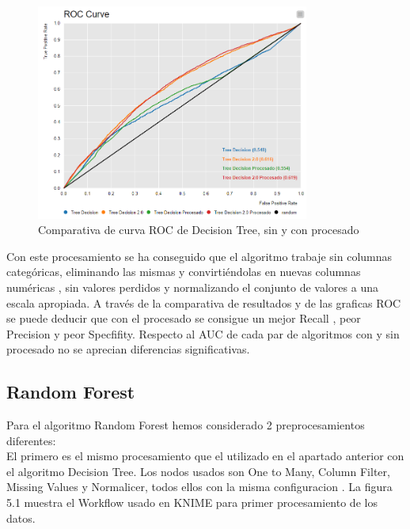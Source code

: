 	\begin{figure}[htb]
		\centering
		\includegraphics[width=0.8\textwidth]{./imagenes/60}
		\caption{Comparativa de curva ROC de Decision Tree, sin y con procesado} \label{fig:1}
	\end{figure}
	
	Con este procesamiento se ha conseguido que el algoritmo trabaje sin columnas categóricas, eliminando las mismas y convirtiéndolas en nuevas columnas numéricas , sin valores perdidos y normalizando el conjunto de valores a una escala apropiada. A través de la comparativa de resultados y de las graficas ROC se puede deducir que con el procesado se consigue un mejor Recall , peor Precision y peor Specfifity. Respecto al AUC de cada par de algoritmos con y sin procesado no se aprecian diferencias significativas.
	
	
	\subsection{Random Forest}
	
	Para el algoritmo Random Forest hemos considerado 2 preprocesamientos diferentes: \\
	
	El primero es el mismo procesamiento que el utilizado en el apartado anterior con el algoritmo Decision Tree. Los nodos usados son One to Many, Column Filter, Missing Values y Normalicer, todos ellos con la misma configuracion . La figura 5.1 muestra el Workflow usado en KNIME para primer procesamiento de los datos. \\
	
